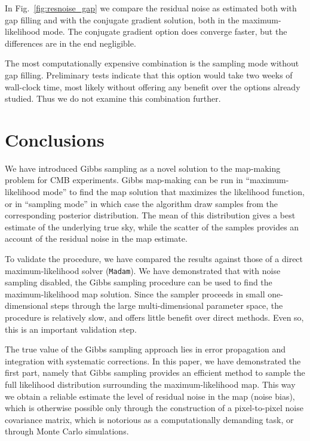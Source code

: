 \documentclass[twocolumn]{aa}
\newcommand{\Madam}{\texttt{Madam}}
\begin{document}
 In Fig.~\ref{fig:resnoise_gap} we compare the residual noise as
estimated both with gap filling and with the conjugate gradient
solution, both in the maximum-likelihood mode.  The conjugate gradient
option does converge faster, but the differences are in the end
negligible.

The most computationally expensive combination is the sampling mode
without gap filling.  Preliminary tests indicate that this option
would take two weeks of wall-clock time, most likely without offering
any benefit over the options already studied.  Thus we do not examine
this combination further.


\section{Conclusions}

We have introduced Gibbs sampling as a novel solution to the
map-making problem for CMB experiments.  Gibbs map-making can be run
in ``maximum-likelihood mode'' to find the map solution that maximizes
the likelihood function, or in ``sampling mode'' in which case the
algorithm draw samples from the corresponding posterior
distribution. The mean of this distribution gives a best estimate of
the underlying true sky, while the scatter of the samples provides an
account of the residual noise in the map estimate.

To validate the procedure, we have compared the results against those
of a direct maximum-likelihood solver (\Madam).  We have demonstrated
that with noise sampling disabled, the Gibbs sampling procedure can be
used to find the maximum-likelihood map solution.  Since the sampler
proceeds in small one-dimensional steps through the large
multi-dimensional parameter space, the procedure is relatively slow,
and offers little benefit over direct methods.  Even so, this is an
important validation step.  

The true value of the Gibbs sampling approach lies in error
propagation and integration with systematic corrections.  In this
paper, we have demonstrated the first part, namely that Gibbs sampling
provides an efficient method to sample the full likelihood
distribution surrounding the maximum-likelihood map.  This way we
obtain a reliable estimate the level of residual noise in the map
(noise bias), which is otherwise possible only through the
construction of a pixel-to-pixel noise covariance matrix, which is notorious as a
computationally demanding task, or through Monte Carlo
simulations. 
\end{document}

